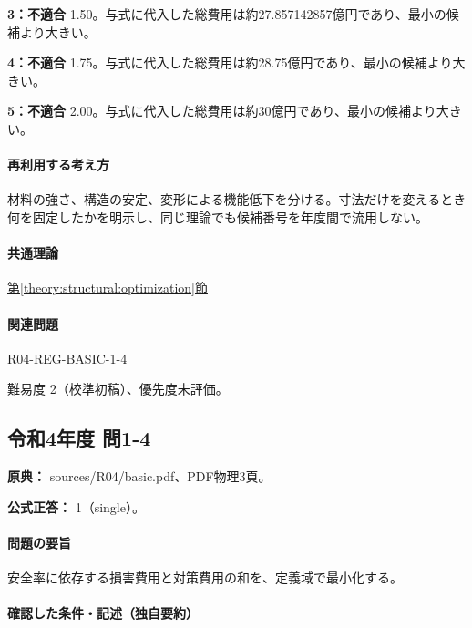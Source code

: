 \noindent\textbf{3：不適合} 1.50。与式に代入した総費用は約27.857142857億円であり、最小の候補より大きい。\par

\noindent\textbf{4：不適合} 1.75。与式に代入した総費用は約28.75億円であり、最小の候補より大きい。\par

\noindent\textbf{5：不適合} 2.00。与式に代入した総費用は約30億円であり、最小の候補より大きい。\par

\paragraph{再利用する考え方} 材料の強さ、構造の安定、変形による機能低下を分ける。寸法だけを変えるとき何を固定したかを明示し、同じ理論でも候補番号を年度間で流用しない。

\paragraph{共通理論} \hyperref[theory:structural:optimization]{第\ref*{theory:structural:optimization}節}

\paragraph{関連問題} \hyperref[q:r04-reg-basic-1-4]{R04-REG-BASIC-1-4}

\par 難易度 2（校準初稿）、優先度未評価。

\subsection{令和4年度 問1-4}
\label{q:r04-reg-basic-1-4}

\noindent\textbf{原典：} sources/R04/basic.pdf、PDF物理3頁。

\textbf{公式正答：} 1（single）。

\paragraph{問題の要旨} 安全率に依存する損害費用と対策費用の和を、定義域で最小化する。

\paragraph{確認した条件・記述（独自要約）}\mbox{}\par

